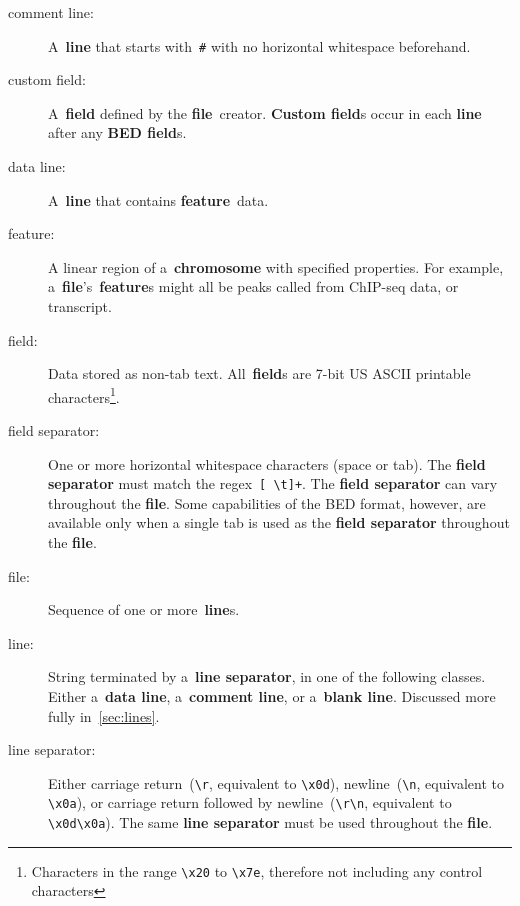 \documentclass[11pt]{article}
\begin{document}
\begin{description}
\item[comment line:]
  A~\textbf{line} that starts with~\texttt{\#} with no horizontal whitespace beforehand.

\item[custom field:]
  A~\textbf{field} defined by the \textbf{file}~creator.
  \textbf{Custom field}s occur in each \textbf{line} after any \textbf{\acs{BED} field}s.

\item[data line:]
  A~\textbf{line} that contains \textbf{feature}~data.

\item[feature:]
  A linear region of a~\textbf{chromosome} with specified properties.
  For example, a~\textbf{file}'s~\textbf{feature}s might all be peaks called from ChIP-seq data, or transcript.

\item[field:]
  Data stored as non-tab text.
  All~\textbf{field}s are 7-bit US \ac{ASCII} printable characters\footnote{Characters in the range \texttt{{\textbackslash}x20} to \texttt{{\textbackslash}x7e}, therefore not including any control characters}.

\item[field separator:]
  One or more horizontal whitespace characters (space or tab).
  The \textbf{field separator} must match the \ac{regex}~\texttt{[ {\textbackslash}t]+}.
  The \textbf{field separator} can vary throughout the \textbf{file}.
  Some capabilities of the \ac{BED} format, however, are available only when a single tab is used as the \textbf{field separator} throughout the \textbf{file}.

\item[file:]
  Sequence of one or more~\textbf{line}s.

\item[line:]
  String terminated by a~\textbf{line separator}, in one of the following classes.
  Either a~\textbf{data line}, a~\textbf{comment line}, or a~\textbf{blank line}.
  Discussed more fully in~\autoref{sec:lines}.

\item[line separator:]
  Either carriage return~(\texttt{{\textbackslash}r}, equivalent to \texttt{{\textbackslash}x0d}), newline~(\texttt{{\textbackslash}n}, equivalent to \texttt{{\textbackslash}x0a}), or carriage return followed by newline~(\texttt{{\textbackslash}r{\textbackslash}n}, equivalent to \texttt{{\textbackslash}x0d{\textbackslash}x0a}).
  The same \textbf{line separator} must be used throughout the \textbf{file}.
\end{description}
\end{document}
